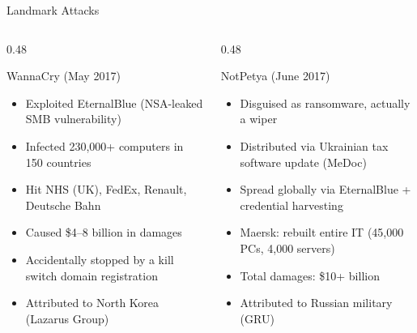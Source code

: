 \documentclass[aspectratio=169]{beamer}
\begin{document}
\begin{frame}{Landmark Attacks}
  \begin{columns}[T]
    \begin{column}{0.48\textwidth}
      \begin{alertblock}{WannaCry (May 2017)}
        \footnotesize
        \begin{itemize}
          \item Exploited EternalBlue (NSA-leaked SMB vulnerability)
          \item Infected 230,000+ computers in 150 countries
          \item Hit NHS (UK), FedEx, Renault, Deutsche Bahn
          \item Caused \$4--8 billion in damages
          \item Accidentally stopped by a kill switch domain registration
          \item Attributed to North Korea (Lazarus Group)
        \end{itemize}
      \end{alertblock}
    \end{column}
    \begin{column}{0.48\textwidth}
      \begin{alertblock}{NotPetya (June 2017)}
        \footnotesize
        \begin{itemize}
          \item Disguised as ransomware, actually a wiper
          \item Distributed via Ukrainian tax software update (MeDoc)
          \item Spread globally via EternalBlue + credential harvesting
          \item Maersk: rebuilt entire IT (45,000 PCs, 4,000 servers)
          \item Total damages: \$10+ billion
          \item Attributed to Russian military (GRU)
        \end{itemize}
      \end{alertblock}
    \end{column}
  \end{columns}
\end{frame}
\end{document}
